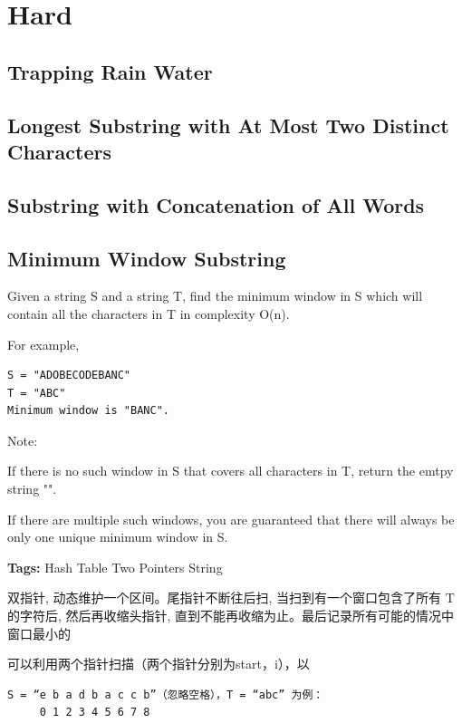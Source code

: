 \documentclass[12pt]{book}
\begin{document}
\section{Hard}
\label{sec-15-3}
\subsection{Trapping Rain Water}
\label{sec-15-3-1}
\subsection{Longest Substring with At Most Two Distinct Characters}
\label{sec-15-3-2}
\subsection{Substring with Concatenation of All Words}
\label{sec-15-3-3}
\subsection{Minimum Window Substring}
\label{sec-15-3-4}
Given a string S and a string T, find the minimum window in S which will contain all the characters in T in complexity O(n).

For example,
\lstset{language=java,label= ,caption= ,numbers=none}
\begin{lstlisting}
S = "ADOBECODEBANC"
T = "ABC"
Minimum window is "BANC".
\end{lstlisting}

Note:

If there is no such window in S that covers all characters in T, return the emtpy string "".

If there are multiple such windows, you are guaranteed that there will always be only one unique minimum window in S.

\textbf{Tags:} Hash Table Two Pointers String

双指针, 动态维护一个区间。尾指针不断往后扫, 当扫到有一个窗口包含了所有 T 的字符后, 
然后再收缩头指针, 直到不能再收缩为止。最后记录所有可能的情况中窗口最小的

可以利用两个指针扫描（两个指针分别为start，i），以
\lstset{language=java,label= ,caption= ,numbers=none}
\begin{lstlisting}
S = “e b a d b a c c b”（忽略空格），T = “abc” 为例：
     0 1 2 3 4 5 6 7 8
\end{lstlisting}
\end{document}
